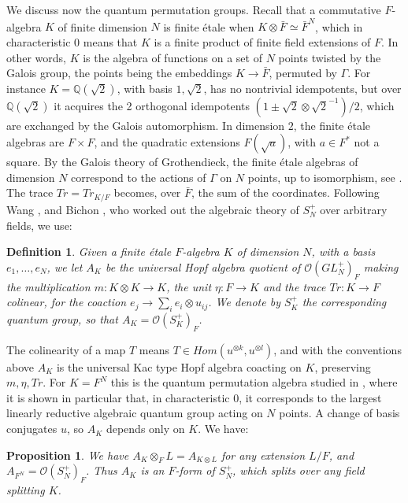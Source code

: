 \documentclass[11pt]{amsart}
\newtheorem{proposition}[theorem]{Proposition}
\newtheorem{definition}[theorem]{Definition}
\theoremstyle{definition}
\begin{document}
We discuss now the quantum permutation groups. Recall that a commutative $F$-algebra $K$ of finite dimension $N$ is finite étale when $K\otimes\bar F\simeq\bar F^N$, which in characteristic 0 means that $K$ is a finite product of finite field extensions of $F$. In other words, $K$ is the algebra of functions on a set of $N$ points twisted by the Galois group, the points being the embeddings $K\to\bar F$, permuted by $\Gamma$. For instance $K=\mathbb Q(\sqrt2)$, with basis $1,\sqrt2$, has no nontrivial idempotents, but over $\mathbb Q(\sqrt2)$ it acquires the 2 orthogonal idempotents $(1\pm\sqrt2\otimes\sqrt2^{-1})/2$, which are exchanged by the Galois automorphism. In dimension $2$, the finite étale algebras are $F\times F$, and the quadratic extensions $F(\sqrt a)$, with $a\in F^*$ not a square. By the Galois theory of Grothendieck, the finite étale algebras of dimension $N$ correspond to the actions of $\Gamma$ on $N$ points, up to isomorphism, see \cite{wat}. The trace $Tr=Tr_{K/F}$ becomes, over $\bar F$, the sum of the coordinates. Following Wang \cite{wan}, and Bichon \cite{bi3}, who worked out the algebraic theory of $S_N^+$ over arbitrary fields, we use:

\begin{definition}
Given a finite étale $F$-algebra $K$ of dimension $N$, with a basis $e_1,\ldots,e_N$, we let $A_K$ be the universal Hopf algebra quotient of $\mathcal O(GL_N^+)_F$ making the multiplication $m:K\otimes K\to K$, the unit $\eta:F\to K$ and the trace $Tr:K\to F$ colinear, for the coaction $e_j\to\sum_ie_i\otimes u_{ij}$. We denote by $S_K^+$ the corresponding quantum group, so that $A_K=\mathcal O(S_K^+)_F$.
\end{definition}

The colinearity of a map $T$ means $T\in Hom(u^{\otimes k},u^{\otimes l})$, and with the conventions above $A_K$ is the universal Kac type Hopf algebra coacting on $K$, preserving $m,\eta,Tr$. For $K=F^N$ this is the quantum permutation algebra studied in \cite{bi3}, where it is shown in particular that, in characteristic 0, it corresponds to the largest linearly reductive algebraic quantum group acting on $N$ points. A change of basis conjugates $u$, so $A_K$ depends only on $K$. We have:

\begin{proposition}
\label{p52}
We have $A_K\otimes_FL=A_{K\otimes L}$ for any extension $L/F$, and $A_{F^N}=\mathcal O(S_N^+)_F$. Thus $A_K$ is an $F$-form of $S_N^+$, which splits over any field splitting $K$.
\end{proposition}
\end{document}
